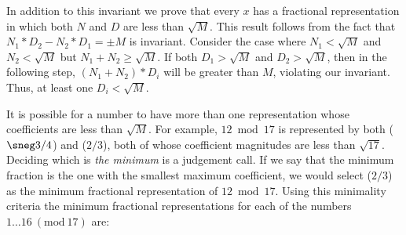 \documentclass[submission,copyright,creativecommons]{eptcs}
\newcommand{\Mod}[1]{\ (\mathrm{mod}\ #1)}
\begin{document}


In addition to this invariant we prove that every $x$ has a fractional
representation in which both $N$ and $D$ are less than $\sqrt{M}$.
This result follows from the fact that $N_1*D_2 - N_2*D_1 = \pm M$ is
invariant.  Consider the case where $N_1 < \sqrt{M}$ and $N_2 <
\sqrt{M}$ but $N_1 + N_2 \geq \sqrt{M}$.  If both $D_1 > \sqrt{M}$
and $D_2 > \sqrt{M}$, then in the following step, $(N_1 + N_2)*D_i$
will be greater than $M$, violating our invariant.  Thus, at least
one $D_i < \sqrt{M}$.






It is possible for a number to have more than one representation whose
coefficients are less than $\sqrt{M}$.  For example, $12 \bmod 17$ is
represented by both ($\sneg3/4$) and ($2/3$), both of whose
coefficient magnitudes are less than $\sqrt{17}$.  Deciding which is
\emph{the minimum} is a judgement call.  If we say that the
minimum fraction is the one with the smallest maximum coefficient, we
would select ($2/3$) as the minimum fractional representation of $12 \bmod 17$.  
Using this minimality criteria the minimum fractional
representations for each of the numbers $1\dots16 \Mod{17}$ are:
\end{document}
